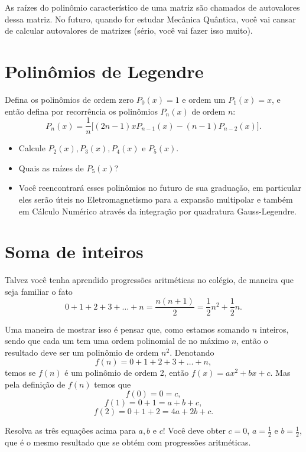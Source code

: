 \documentclass[a4paper,fleqn,12pt]{article}
\begin{document}
\n

As raízes do polinômio característico de uma matriz são chamados de autovalores dessa matriz. No futuro, quando for estudar Mecânica Quântica, você vai cansar de calcular autovalores de matrizes (sério, você vai fazer isso muito).

\pagebreak

\section{Polinômios de Legendre}

Defina os polinômios de ordem zero $P_0(x) = 1$ e ordem um $P_1(x) = x$, e então defina por recorrência os polinômios $P_n(x)$ de ordem $n$:
$$
P_n(x) = \frac{1}{n} \Big[(2n - 1) x P_{n-1}(x) - (n-1) P_{n-2}(x)\Big].
$$

\begin{itemize}
\item Calcule $P_2(x), P_3(x), P_4(x)$ e $P_5(x)$.
\item Quais as raízes de $P_5(x)$?
\item Você reencontrará esses polinômios no futuro de sua graduação, em particular eles serão úteis no Eletromagnetismo para a expansão multipolar e também em Cálculo Numérico através da integração por quadratura Gauss-Legendre.
\end{itemize}

\pagebreak

\section{Soma de inteiros}

Talvez você tenha aprendido progressões aritméticas no colégio, de maneira que seja familiar o fato
$$
0 + 1 + 2 + 3 + \ldots + n = \frac{n(n+1)}{2} = \frac{1}{2} n^2 + \frac{1}{2} n.
$$

Uma maneira de mostrar isso é pensar que, como estamos somando $n$ inteiros, sendo que cada um tem uma ordem polinomial de no máximo $n$, então o resultado deve ser um polinômio de ordem $n^2$. Denotando
$$
f(n) = 0 + 1 + 2 + 3 + \ldots + n,
$$
temos se $f(n)$ é um polinômio de ordem 2, então $f(x) = a x^2 + b x + c$. Mas pela definição de $f(n)$ temos que
$$
f(0) = 0 = c,
$$
$$
f(1) = 0 + 1 = a + b + c,
$$
$$
f(2) = 0 + 1 + 2 = 4 a + 2 b + c.
$$

Resolva as três equações acima para $a, b$ e $c$! Você deve obter $c = 0$, $a = \frac{1}{2}$ e $b = \frac{1}{2}$, que é o mesmo resultado que se obtém com progressões aritméticas.
\end{document}
